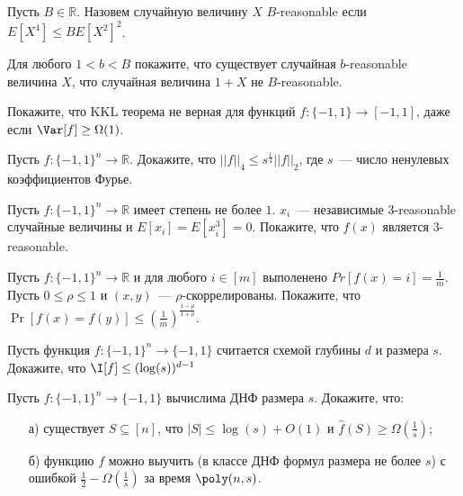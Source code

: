 
Пусть $B \in \mathbb{R}$. Назовем случайную величину $X$ $B$-reasonable если $E[X^4] \le B E[X^2]^2$.

\begin{task}
    Для любого $1 < b < B$ покажите, что существует случайная $b$-reasonable величина $X$, что случайная величина $1 + X$ не
    $B$-reasonable.
\end{task}


\begin{task}
    Покажите, что KKL теорема не верная для функций $f: \{-1, 1\} \to [-1, 1]$, даже если $\Var[f] \ge \Omega(1)$.
\end{task}

\begin{ptask}{25}
    Пусть $f: \{-1, 1\}^n \to \mathbb{R}$. Докажите, что $||f||_4 \le s^{\frac{1}{4}} ||f||_2$, где $s$~--- число ненулевых
    коэффициентов Фурье.
\end{ptask}

\begin{task}
    Пусть $f: \{-1, 1\}^n \to \mathbb{R}$ имеет степень не более $1$. $x_i$~--- независимые $3$-reasonable случайные
    величины и $E[x_i] = E[x_i^3] = 0$. Покажите, что $f(x)$ является $3$-reasonable.
\end{task}

\begin{task}
    Пусть $f: \{-1, 1\}^n \to \mathbb{R}$ и для любого $i \in [m]$ выполенено $Pr[f(x) = i] = \frac{1}{m}$. Пусть $0 \le \rho
    \le 1$ и $(x, y)$~--- $\rho$-скоррелированы. Покажите, что $\Pr[f(x) = f(y)] \le (\frac{1}{m})^{\frac{1 - \rho}{1 + \rho}}$.
\end{task}



\breakline

\begin{ptask}{25}
    Пусть функция $f: \{-1, 1\}^n \to \{-1, 1\}$ считается схемой глубины $d$ и размера $s$. Докажите, что $\I[f] \le
    (\log(s))^{d - 1}$
\end{ptask}



\begin{ptask}{27}
    Пусть $f:\{-1, 1\}^n \to \{-1, 1\}$ вычислима ДНФ размера $s$. Докажите, что:
   	\begin{enumerate}[topsep = 0pt, itemsep = -1ex]
        \item [а)] существует $S \subseteq [n]$, что $|S| \le \log(s) + O(1)$ и $\hat{f}(S) \ge \Omega(\frac{1}{s})$;
        \item [б)] функцию $f$ можно выучить (в классе ДНФ формул размера не более $s$) с ошибкой $\frac{1}{2} -
            \Omega(\frac{1}{s})$ за время $\poly(n, s)$.
	\end{enumerate}
\end{ptask}

